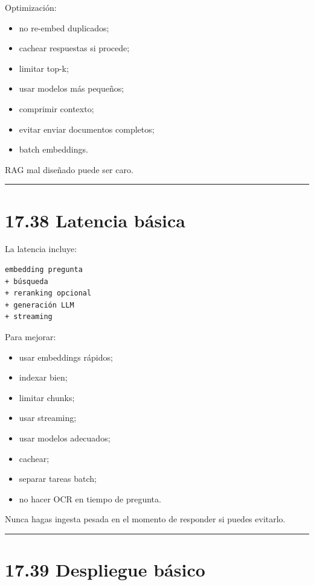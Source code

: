 Optimización:

\begin{itemize}
\tightlist
\item
  no re-embed duplicados;
\item
  cachear respuestas si procede;
\item
  limitar top-k;
\item
  usar modelos más pequeños;
\item
  comprimir contexto;
\item
  evitar enviar documentos completos;
\item
  batch embeddings.
\end{itemize}

RAG mal diseñado puede ser caro.

\begin{center}\rule{0.5\linewidth}{0.5pt}\end{center}

\section{17.38 Latencia básica}\label{latencia-buxe1sica}

La latencia incluye:

\begin{lstlisting}
embedding pregunta
+ búsqueda
+ reranking opcional
+ generación LLM
+ streaming
\end{lstlisting}

Para mejorar:

\begin{itemize}
\tightlist
\item
  usar embeddings rápidos;
\item
  indexar bien;
\item
  limitar chunks;
\item
  usar streaming;
\item
  usar modelos adecuados;
\item
  cachear;
\item
  separar tareas batch;
\item
  no hacer OCR en tiempo de pregunta.
\end{itemize}

Nunca hagas ingesta pesada en el momento de responder si puedes
evitarlo.

\begin{center}\rule{0.5\linewidth}{0.5pt}\end{center}

\section{17.39 Despliegue básico}\label{despliegue-buxe1sico}

